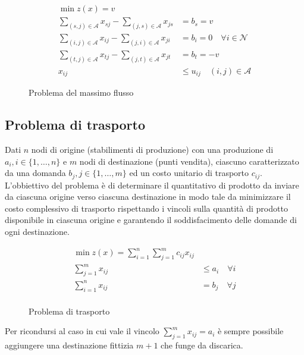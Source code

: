 \documentclass[\main/main.tex]{subfiles}
\begin{document}
\begin{figure}
	\begin{align*}
		\min z(x) = v                                                                                                         \\
		\sum_{(s,j) \in \mathcal{A}} x_{sj} - \sum_{(j,s) \in \mathcal{A}} x_{js} & = b_s =v                                  \\
		\sum_{(i,j) \in \mathcal{A}} x_{ij} - \sum_{(j,i) \in \mathcal{A}} x_{ji} & = b_i = 0 \quad \forall i \in \mathcal{N} \\
		\sum_{(t,j) \in \mathcal{A}} x_{tj} - \sum_{(j,t) \in \mathcal{A}} x_{jt} & = b_t = -v                                \\
		x_{ij}                                                                    & \leq u_{ij} \quad (i,j) \in \mathcal{A}
	\end{align*}
	\caption{Problema del massimo flusso}
\end{figure}

\subsection{Problema di trasporto}
Dati $n$ nodi di origine (stabilimenti di produzione) con una produzione di $a_i, i \in \{1, \ldots, n\}$ e $m$ nodi di destinazione (punti vendita), ciascuno caratterizzato da una domanda $b_j, j \in \{1, \ldots, m\}$ ed un costo unitario di trasporto $c_{ij}$. L'obbiettivo del problema è di determinare il quantitativo di prodotto da inviare da ciascuna origine verso ciascuna destinazione in modo tale da minimizzare il costo complessivo di trasporto rispettando i vincoli sulla quantità di prodotto disponibile in ciascuna origine e garantendo il soddisfacimento delle domande di ogni destinazione.

\begin{figure}
	\begin{align*}
		\min z(x) = \sum_{i=1}^n\sum_{j=1}^m c_{ij}x_{ij} \\
		\sum_{j=1}^m x_{ij} & \leq a_i \quad \forall i    \\
		\sum_{i=1}^n x_{ij} & = b_j  \quad \forall j      \\
	\end{align*}
	\caption{Problema di trasporto}
\end{figure}

Per ricondursi al caso in cui vale il vincolo $\sum_{j=1}^m x_{ij} = a_i$ è sempre possibile aggiungere una destinazione fittizia $m+1$ che funge da discarica.
\end{document}
